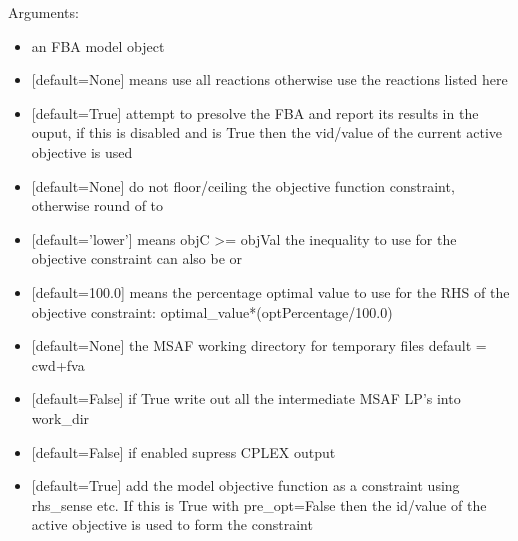 \documentclass[letterpaper,10pt,english]{sphinxmanual}
\begin{document}
\begin{fulllineitems}
\sphinxAtStartPar
Arguments:
\begin{itemize}
\item {} 
\sphinxAtStartPar
{} an FBA model object

\item {} 
\sphinxAtStartPar
{} {[}default=None{]} means use all reactions otherwise use the reactions listed here

\item {} 
\sphinxAtStartPar
{} {[}default=True{]} attempt to presolve the FBA and report its results in the ouput, if this is disabled and  is True then the vid/value of the current active objective is used

\item {} 
\sphinxAtStartPar
{}  {[}default=None{]} do not floor/ceiling the objective function constraint, otherwise round of to 

\item {} 
\sphinxAtStartPar
{} {[}default=’lower’{]} means objC \textgreater{}= objVal the inequality to use for the objective constraint can also be  or 

\item {} 
\sphinxAtStartPar
{} {[}default=100.0{]} means the percentage optimal value to use for the RHS of the objective constraint: optimal\_value*(optPercentage/100.0)

\item {} 
\sphinxAtStartPar
{} {[}default=None{]} the MSAF working directory for temporary files default = cwd+fva

\item {} 
\sphinxAtStartPar
{} {[}default=False{]} if True write out all the intermediate MSAF LP’s into work\_dir

\item {} 
\sphinxAtStartPar
{} {[}default=False{]} if enabled supress CPLEX output

\item {} 
\sphinxAtStartPar
{} {[}default=True{]} add the model objective function as a constraint using rhs\_sense etc. If
this is True with pre\_opt=False then the id/value of the active objective is used to form the constraint


\end{itemize}
\end{fulllineitems}
\end{document}
